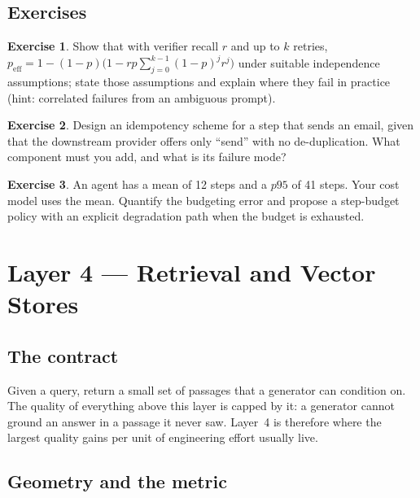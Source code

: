 \documentclass[11pt,twoside,openright]{book}
\theoremstyle{definition}
\newtheorem{exercise}{Exercise}[chapter]
\theoremstyle{plain}
\theoremstyle{remark}
\begin{document}
\section{Exercises}

\begin{exercise}
Show that with verifier recall $r$ and up to $k$ retries,
$p_{\text{eff}} = 1-(1-p)\bigl(1-rp\sum_{j=0}^{k-1}(1-p)^j r^j\bigr)$ under
suitable independence assumptions; state those assumptions and explain where
they fail in practice (hint: correlated failures from an ambiguous prompt).
\end{exercise}

\begin{exercise}
Design an idempotency scheme for a step that sends an email, given that the
downstream provider offers only ``send'' with no de-duplication. What component
must you add, and what is its failure mode?
\end{exercise}

\begin{exercise}
An agent has a mean of 12 steps and a $p95$ of 41 steps. Your cost model uses
the mean. Quantify the budgeting error and propose a step-budget policy with an
explicit degradation path when the budget is exhausted.
\end{exercise}

\cleardoublepage

\chapter{Layer 4 --- Retrieval and Vector Stores}
\label{ch:retrieval}

\section{The contract}

Given a query, return a small set of passages that a generator can condition on.
The quality of everything above this layer is capped by it: a generator cannot
ground an answer in a passage it never saw. Layer~4 is therefore where the
largest quality gains per unit of engineering effort usually live.

\section{Geometry and the metric}
\end{document}
